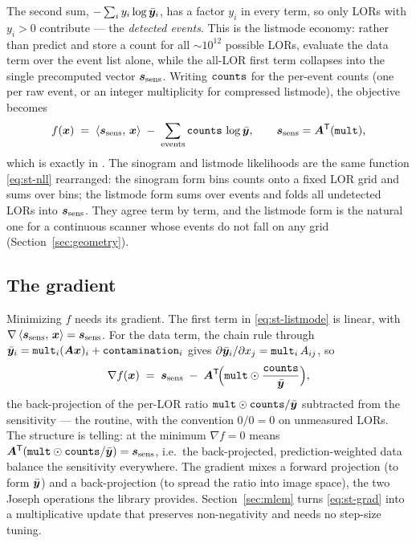 The second sum, $-\sum_i y_i \log \bar{\bm{y}}_i$, has a factor $y_i$ in every term, so
only LORs with $y_i>0$ contribute --- the \emph{detected events}. This is the
listmode economy: rather than predict and store a count for all $\sim\!10^{12}$
possible LORs, evaluate the data term over the event list alone, while the
all-LOR first term collapses into the single precomputed vector $\bm{s}_{\mathrm{sens}}$.
Writing $\texttt{counts}$ for the per-event counts (one per raw event, or an
integer multiplicity for compressed listmode), the objective becomes
\begin{equation}
  f(\bm{x}) \;=\; \left\langle \bm{s}_{\mathrm{sens}},\, \bm{x}\right\rangle
            \;-\; \sum_{\text{events}} \texttt{counts}\,\log \bar{\bm{y}} ,
  \qquad
  \bm{s}_{\mathrm{sens}}=\bm{A}^{\mathsf{T}}(\texttt{mult}),
  \label{eq:st-listmode}
\end{equation}
which is exactly  in . The
sinogram and listmode likelihoods are the same function \eqref{eq:st-nll}
rearranged: the sinogram form bins counts onto a fixed LOR grid and sums over
bins; the listmode form sums over events and folds all undetected LORs into
$\bm{s}_{\mathrm{sens}}$. They agree term by term, and the listmode form is the natural one for a
continuous scanner whose events do not fall on any grid
(Section~\ref{sec:geometry}).

\subsection{The gradient}
\label{sec:statistics:gradient}

Minimizing $f$ needs its gradient. The first term in \eqref{eq:st-listmode} is
linear, with $\nabla\left\langle \bm{s}_{\mathrm{sens}},\, \bm{x}\right\rangle=\bm{s}_{\mathrm{sens}}$. For the data term, the chain
rule through $\bar{\bm{y}}_i=\texttt{mult}_i(\bm{A}\bm{x})_i+\texttt{contamination}_i$ gives
$\partial \bar{\bm{y}}_i/\partial x_j = \texttt{mult}_i\,A_{ij}$, so
\begin{equation}
  \nabla f(\bm{x}) \;=\; \bm{s}_{\mathrm{sens}} \;-\; \bm{A}^{\mathsf{T}}\!\Bigl(\texttt{mult}\odot
                     \frac{\texttt{counts}}{\bar{\bm{y}}}\Bigr),
  \label{eq:st-grad}
\end{equation}
the back-projection of the per-LOR ratio $\texttt{mult}\odot\texttt{counts}/\bar{\bm{y}}$
subtracted from the sensitivity --- the  routine, with the
convention $0/0=0$ on unmeasured LORs. The structure is telling: at the minimum
$\nabla f=0$ means $\bm{A}^{\mathsf{T}}(\texttt{mult}\odot\texttt{counts}/\bar{\bm{y}})=\bm{s}_{\mathrm{sens}}$, i.e.\ the
back-projected, prediction-weighted data balance the sensitivity everywhere. The
gradient mixes a forward projection (to form $\bar{\bm{y}}$) and a back-projection (to
spread the ratio into image space), the two Joseph operations the library
provides. Section~\ref{sec:mlem} turns \eqref{eq:st-grad} into a multiplicative
update that preserves non-negativity and needs no step-size tuning.
